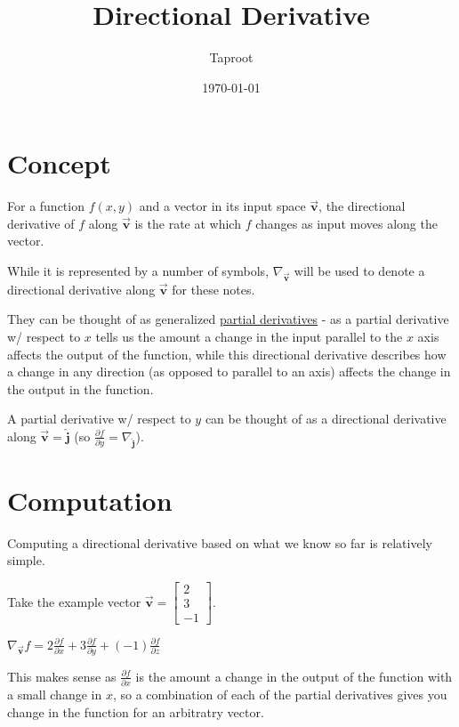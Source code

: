 \documentclass[letterpaper]{article}
\author{Taproot}
\date{\today}
\title{Directional Derivative}
\renewcommand\maketitle{}
\begin{document}
\maketitle

\section{Concept}
\label{sec:org367760d}
For a function \(f(x,y)\) and a vector in its input space \(\vec{\textbf{v}}\), the directional derivative of \(f\) along \(\vec{\mathbf{v}}\) is the rate at which \(f\) changes as input moves along the vector. 

While it is represented by a number of symbols, \(\nabla_{\vec{\textbf{v}}}\) will be used to denote a directional derivative along \(\vec{\textbf{v}}\) for these notes.

They can be thought of as generalized \href{partial-derivatives.org}{partial derivatives} - as a partial derivative w/ respect to \(x\) tells us the amount a change in the input parallel to the \(x\) axis affects the output of the function, while this directional derivative describes how a change in any direction (as opposed to parallel to an axis) affects the change in the output in the function. 

\begin{note}
A partial derivative w/ respect to \(y\) can be thought of as a directional derivative along \(\vec{\mathbf{v}} = \widehat{\mathbf{j}}\) (so \(\frac{\partial f}{\partial y} = \nabla_{\widehat{\mathbf{j}}}\)).
\end{note}

\section{Computation}
\label{sec:org8089a8e}

Computing a directional derivative based on what we know so far is relatively simple. 

Take the example vector \(\vec{\mathbf{v}} = \left[\begin{matrix}2 \\ 3 \\ -1 \end{matrix}\right]\).

\(\nabla_{\vec{\textbf{v}}} f = 2\frac{\partial f}{\partial x} + 3\frac{\partial f}{\partial y} + (-1)\frac{\partial f}{\partial z}\)

This makes sense as \(\frac{\partial f}{\partial x}\) is the amount a change in the output of the function with a small change in \(x\), so a combination of each of the partial derivatives gives you change in the function for an arbitratry vector.
\end{document}
